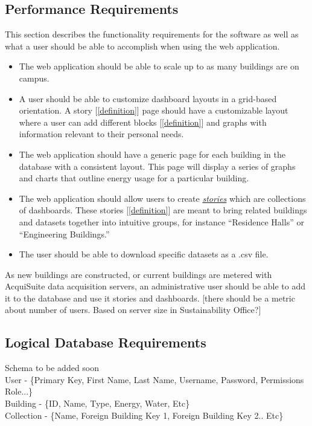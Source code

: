 \documentclass[onecolumn, draftclsnofoot,10pt, compsoc]{IEEEtran}
\begin{document}
    \subsection{Performance Requirements}
    This section describes the functionality requirements for the software as well as what a user should be able to accomplish when using the web application.
    \begin{itemize}
        \item The web application should be able to scale up to as many buildings are on campus.
        \item A user should be able to customize dashboard layouts in a grid-based orientation. A story [\ref{definition}] page should have a customizable layout where a user can add different blocks [\ref{definition}] and graphs with information relevant to their personal needs.
        \item The web application should have a generic page for each building in the database with a consistent layout. This page will display a series of graphs and charts that outline energy usage for a particular building.
        \item The web application should allow users to create \hyperref[definition]{\textit{stories}} which are collections of dashboards. These stories [\ref{definition}] are meant to bring related buildings and datasets together into intuitive groups, for instance ``Residence Halls'' or ``Engineering Buildings.''
        \item The user should be able to download specific datasets as a .csv file.
    \end{itemize}

     As new buildings are constructed, or current buildings are metered with AcquiSuite data acquisition servers, an administrative user should be able to add it to the database and use it stories and dashboards.  
    [there should be a metric about number of users. Based on server size in Sustainability Office?]
    
    \subsection{Logical Database Requirements}
    Schema to be added soon\\
    User - \{Primary Key, First Name, Last Name, Username, Password, Permissions Role...\} \\ 
    Building - \{ID, Name, Type, Energy, Water, Etc\}\\
    Collection - \{Name, Foreign Building Key 1, Foreign Building Key 2.. Etc\}
    
\end{document}
